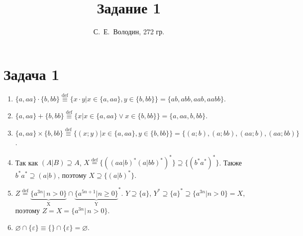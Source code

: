 \documentclass[a4paper]{article}
\title{Задание 1}
\author{С.~Е.~Володин, 272 гр.}
\date{}
\begin{document}
\maketitle
\section*{Задача 1}
\begin{enumerate}
\item $\{a,aa\}\cdot\{b,bb\}\overset{\mathrm{def}}{\equiv}\{x\cdot y|x\in \{a,aa\},y\in \{b,bb\}\}=\{ab,abb,aab,aabb\}.$
\item $\{a,aa\}+\{b,bb\}\overset{\mathrm{def}}{\equiv}\{x|x\in \{a,aa\} \vee x\in \{b,bb\}\}=\{a,aa,b,bb\}$.
\item $\{a,aa\}\times\{b,bb\}\overset{\mathrm{def}}{\equiv}\{(x;y)|x\in \{a,aa\}, y\in \{b,bb\}\}=\{(a;b),(a;bb),(aa;b),(aa;bb)\}$.
\item Так как $(A|B)\supseteq A$, $X\overset{\mathrm{def}}{=}\{((aa|b)^*(a|bb)^*)^*\}\supseteq \{(b^*a^*)^*\}$. Также $b^*a^*\supseteq (a|b)$, поэтому $X\supseteq \{(a|b)^*\}$.
\item $Z\overset{\mathrm{def}}{=}\underbrace{\{ a^{3n} | \, n>0\}}_\text{X} \cap {\underbrace{\{ a^{5n+1} | n \geq 0\}}_\text{Y}}^*$. $Y\supseteq \{a\}$, $Y^*\supseteq\{a\}^*\supseteq \{a^{3n}|n>0\}=X$, поэтому $Z=X=\{ a^{3n} | \, n>0\}$.
\item $\varnothing\cap\{\varepsilon\}\equiv\{\}\cap\{\varepsilon\}=\varnothing$.
\end{enumerate}
\end{document}
